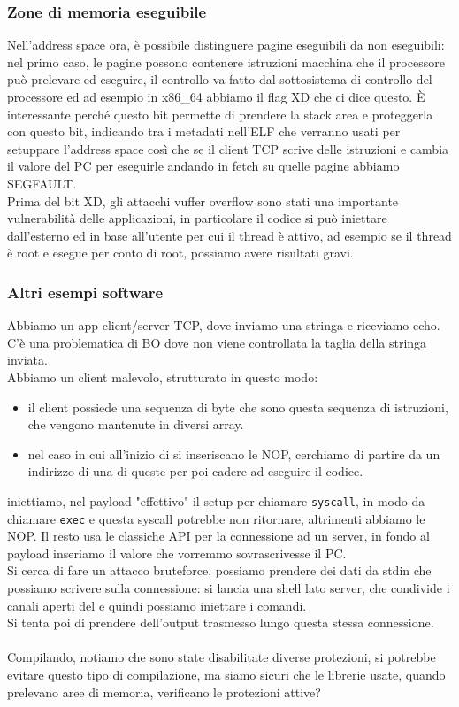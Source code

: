 \documentclass[12pt, oneside]{extbook}
\begin{document}
\subsubsection{Zone di memoria eseguibile}
Nell'address space ora, è possibile distinguere pagine eseguibili da non eseguibili: nel primo caso, le pagine possono contenere istruzioni macchina che il processore può prelevare ed eseguire, il controllo va fatto dal sottosistema di controllo del processore ed ad esempio in x86\_64 abbiamo il flag XD che ci dice questo. È interessante perché questo bit permette di prendere la stack area e proteggerla con questo bit, indicando tra i metadati nell'ELF che verranno usati per setuppare l'address space così che se il client TCP scrive delle istruzioni e cambia il valore del PC per eseguirle andando in fetch su quelle pagine abbiamo SEGFAULT.\\Prima del bit XD, gli attacchi vuffer overflow sono stati una importante vulnerabilità delle applicazioni, in particolare il codice si può iniettare dall'esterno ed in base all'utente per cui il thread è attivo, ad esempio se il thread è root e esegue per conto di root, possiamo avere risultati gravi.
\subsubsection*{Altri esempi software}
Abbiamo un app client/server TCP, dove inviamo una stringa e riceviamo echo. C'è una problematica di BO dove non viene controllata la taglia della stringa inviata.\\Abbiamo un client malevolo, strutturato in questo modo:
\begin{itemize}
	\item il client possiede una sequenza di byte che sono questa sequenza di istruzioni, che vengono mantenute in diversi array.
	\item nel caso in cui all'inizio di si inseriscano le NOP, cerchiamo di partire da un indirizzo di una di queste per poi cadere ad eseguire il codice.
\end{itemize}
iniettiamo, nel payload "effettivo" il setup per chiamare \texttt{syscall}, in modo da chiamare \texttt{exec} e questa syscall potrebbe non ritornare, altrimenti abbiamo le NOP. Il resto usa le classiche API per la connessione ad un server, in fondo al payload inseriamo il valore che vorremmo sovrascrivesse il PC.\\Si cerca di fare un attacco bruteforce, possiamo prendere dei dati da stdin che possiamo scrivere sulla connessione: si lancia una shell lato server, che condivide i canali aperti del e quindi possiamo iniettare i comandi.\\Si tenta poi di prendere dell'output trasmesso lungo questa stessa connessione.\\\\Compilando, notiamo che sono state disabilitate diverse protezioni, si potrebbe evitare questo tipo di compilazione, ma siamo sicuri che le librerie usate, quando prelevano aree di memoria, verificano le protezioni attive?
\end{document}
